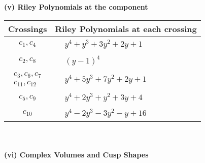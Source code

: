 \documentclass[1p]{elsarticle_modified}
\theoremstyle{definition}
\begin{document}
\newpage\renewcommand{\arraystretch}{1}
\flushleft \textbf{(v) Riley Polynomials at the component}\newline \\
\begin{tabular}{m{50pt}|m{274pt}}
Crossings & \hspace{64pt}Riley Polynomials at each crossing \\
\hline $$\begin{aligned}c_{1},c_{4}\end{aligned}$$&$\begin{aligned}
&y^4+y^3+3 y^2+2 y+1
\end{aligned}$\\
\hline $$\begin{aligned}c_{2},c_{8}\end{aligned}$$&$\begin{aligned}
&(y-1)^4
\end{aligned}$\\
\hline $$\begin{aligned}c_{3},c_{6},c_{7}\\c_{11},c_{12}\end{aligned}$$&$\begin{aligned}
&y^4+5 y^3+7 y^2+2 y+1
\end{aligned}$\\
\hline $$\begin{aligned}c_{5},c_{9}\end{aligned}$$&$\begin{aligned}
&y^4+2 y^3+y^2+3 y+4
\end{aligned}$\\
\hline $$\begin{aligned}c_{10}\end{aligned}$$&$\begin{aligned}
&y^4-2 y^3-3 y^2- y+16
\end{aligned}$\\
\hline
\end{tabular}\\~\\
\newpage\flushleft \textbf{(vi) Complex Volumes and Cusp Shapes}
\end{document}
